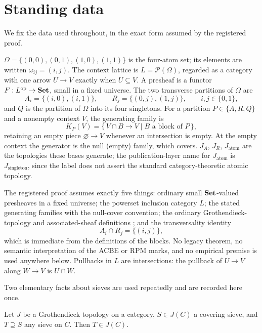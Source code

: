 \section{Standing data}
\label{ch10:sec:standing}

We fix the data used throughout, in the exact form assumed by the registered
proof.

\begin{notation}
\label{ch10:not:standing}
$\Omega = \{(0,0), (0,1), (1,0), (1,1)\}$ is the four-atom set; its elements
are written $\omega_{ij} = (i,j)$. The context lattice is
$L = \mathcal{P}(\Omega)$, regarded as a category with one arrow $U \to V$
exactly when $U \subseteq V$. A presheaf is a functor
$F : L^{\mathrm{op}} \to \mathbf{Set}$, small in a fixed universe. The two transverse
partitions of $\Omega$ are
\[
A_i = \{(i,0), (i,1)\}, \qquad R_j = \{(0,j), (1,j)\}, \qquad i, j \in \{0,1\},
\]
and $Q$ is the partition of $\Omega$ into its four singletons. For a partition
$P \in \{A, R, Q\}$ and a nonempty context $V$, the generating family is
\[
K_P(V) = \{\, V \cap B \to V \mid B \text{ a block of } P \,\},
\]
retaining an empty piece $\varnothing \to V$ whenever an intersection is empty.
At the empty context the generator is the null (empty) family, which covers.
$J_A$, $J_R$, $J_{\mathrm{atom}}$ are the topologies these bases generate; the
publication-layer name for $J_{\mathrm{atom}}$ is $J_{\mathrm{singleton}}$,
since the label does not assert the standard category-theoretic atomic
topology.
\end{notation}

The registered proof assumes exactly five things: ordinary small $\mathbf{Set}$-valued
presheaves in a fixed universe; the powerset inclusion category $L$; the stated
generating families with the null-cover convention; the ordinary
Grothendieck-topology and associated-sheaf definitions
\cite{maclane, stacks00ZC}; and the transversality identity
\begin{equation}
\label{ch10:eq:transverse}
A_i \cap R_j = \{(i,j)\},
\end{equation}
which is immediate from the definitions of the blocks. No legacy theorem, no
semantic interpretation of the ACBE or RPM marks, and no empirical premise is
used anywhere below. Pullbacks in $L$ are intersections: the pullback of
$U \to V$ along $W \to V$ is $U \cap W$.

Two elementary facts about sieves are used repeatedly and are recorded here
once.

\begin{lemma}
\label{ch10:lem:supersieve}
Let $J$ be a Grothendieck topology on a category, $S \in J(C)$ a covering
sieve, and $T \supseteq S$ any sieve on $C$. Then $T \in J(C)$.
\end{lemma}


